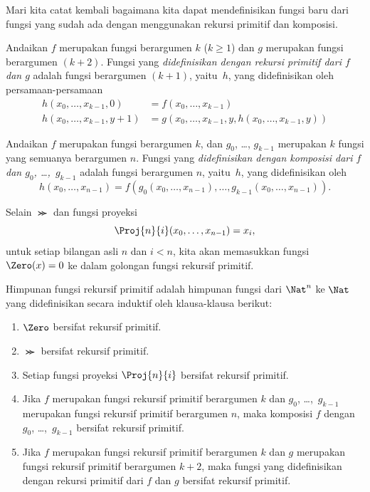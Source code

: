 \documentclass[../../../include/open-logic-section]{subfiles}
\begin{document}

Mari kita catat kembali bagaimana kita dapat mendefinisikan fungsi baru dari
fungsi yang sudah ada dengan menggunakan rekursi primitif dan komposisi.

\begin{defn}
   Andaikan $f$ merupakan fungsi berargumen
  $k$ ($k\ge 1$) dan $g$ merupakan fungsi berargumen $(k+2)$. Fungsi yang
  \emph{didefinisikan dengan rekursi primitif dari $f$ dan $g$} adalah fungsi
  berargumen $(k+1)$, yaitu~$h$, yang didefinisikan oleh persamaan-persamaan
  \begin{align*}
    h(x_0,\dots,x_{k-1},0) & =  f(x_0,\dots,x_{k-1}) \\
    h(x_0,\dots,x_{k-1},y+1) & = g(x_0,\dots,x_{k-1}, y, h(x_0,\dots,x_{k-1}, y))
  \end{align*}
\end{defn}

\begin{defn}
   Andaikan $f$ merupakan fungsi berargumen $k$,
  dan $g_0$, \dots, $g_{k-1}$ merupakan $k$ fungsi yang semuanya berargumen
  $n$. Fungsi yang \emph{didefinisikan dengan komposisi dari $f$ dan $g_0$,
    \dots,~$g_{k-1}$} adalah fungsi berargumen $n$, yaitu~$h$, yang
  didefinisikan oleh
  \[
  h(x_0, \dots, x_{n-1}) =
  f(g_0(x_0, \dots, x_{n-1}), \dots, g_{k-1}(x_0, \dots, x_{n-1})).
  \]
\end{defn}

Selain $\Succ$ dan fungsi proyeksi
\[
\Proj{n}{i}(x_0,\dots,x_{n-1}) = x_i,
\]
untuk setiap bilangan asli $n$ dan $i < n$, kita akan memasukkan fungsi
$\Zero(x) = 0$ ke dalam golongan fungsi rekursif primitif.

\begin{defn}
  Himpunan fungsi rekursif primitif adalah himpunan fungsi dari $\Nat^n$ ke
  $\Nat$ yang didefinisikan secara induktif oleh klausa-klausa berikut:
  \begin{enumerate}
  \item $\Zero$ bersifat rekursif primitif.
  \item $\Succ$ bersifat rekursif primitif.
  \item Setiap fungsi proyeksi $\Proj{n}{i}$ bersifat rekursif primitif.
  \item Jika $f$ merupakan fungsi rekursif primitif berargumen $k$ dan $g_0$,
    \dots,~$g_{k-1}$ merupakan fungsi rekursif primitif berargumen $n$, maka
    komposisi $f$ dengan $g_0$, \dots,~$g_{k-1}$ bersifat rekursif primitif.
  \item Jika $f$ merupakan fungsi rekursif primitif berargumen $k$ dan $g$
    merupakan fungsi rekursif primitif berargumen $k+2$, maka fungsi yang
    didefinisikan dengan rekursi primitif dari $f$ dan $g$ bersifat rekursif
    primitif.
\end{enumerate}
\end{defn}
\end{document}
